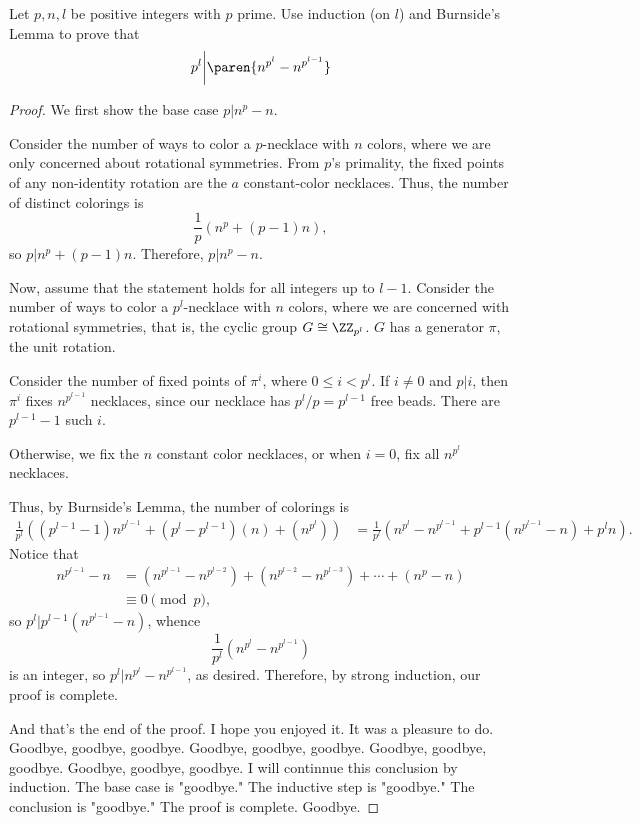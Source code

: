 \documentclass[11pt]{article}
\begin{document}
\begin{quest}
    Let $p,n,l$ be positive integers with $p$ prime. Use induction (on $l$) and Burnside's Lemma to prove that \[p^l\bigg\vert\paren{n^{p^l}-n^{p^{l-1}}}\]
\end{quest}
\begin{proof}
    We first show the base case $p|n^p-n$.

    Consider the number of ways to color a $p$-necklace with $n$ colors, where we are only concerned about rotational symmetries. From $p$'s primality, the fixed points of any non-identity rotation are the $a$ constant-color necklaces. Thus, the number of distinct colorings is \[\frac{1}{p}(n^p+(p-1)n),\] so $p|n^p+(p-1)n$. Therefore, $p|n^p-n$.

    Now, assume that the statement holds for all integers up to $l-1$. Consider the number of ways to color a $p^l$-necklace with $n$ colors, where we are concerned with rotational symmetries, that is, the cyclic group $G\cong \ZZ_{p^l}$. $G$ has a generator $\pi$, the unit rotation.

    Consider the number of fixed points of $\pi^i$, where $0\leq i<p^l$. If $i\neq0$ and $p|i$, then $\pi^i$ fixes $n^{p^{l-1}}$ necklaces, since our necklace has $p^l/p=p^{l-1}$ free beads. There are $p^{l-1}-1$ such $i$.
    
    Otherwise, we fix the $n$ constant color necklaces, or when $i=0$, fix all $n^{p^{l}}$ necklaces. 
    
    Thus, by Burnside's Lemma, the number of colorings is 
    \begin{align*}        
        \frac{1}{p^l}((p^{l-1}-1)n^{p^{l-1}}+(p^{l}-p^{l-1})(n)+(n^{p^l}))&=\frac{1}{p^l}(n^{p^l}-n^{p^{l-1}}+p^{l-1}(n^{p^{l-1}}-n)+p^ln).
    \end{align*}
    Notice that 
    \begin{align*}
        n^{p^{l-1}}-n&=(n^{p^{l-1}}-n^{p^{l-2}})+(n^{p^{l-2}}-n^{p^{l-3}})+\cdots+(n^p-n)\\
        &\equiv 0\pmod{p},
    \end{align*}
    so $p^l|p^{l-1}(n^{p^{l-1}}-n)$, whence \[\frac{1}{p^l}(n^{p^l}-n^{p^{l-1}})\] is an integer, so $p^l|n^{p^l}-n^{p^{l-1}}$, as desired. Therefore, by strong induction, our proof is complete.

    And that's the end of the proof. I hope you enjoyed it. It was a pleasure to do. Goodbye, goodbye, goodbye. Goodbye, goodbye, goodbye. Goodbye, goodbye, goodbye. Goodbye, goodbye, goodbye. I will continnue this conclusion by induction. The base case is "goodbye." The inductive step is "goodbye." The conclusion is "goodbye." The proof is complete. Goodbye.
\end{proof}
\end{document}
